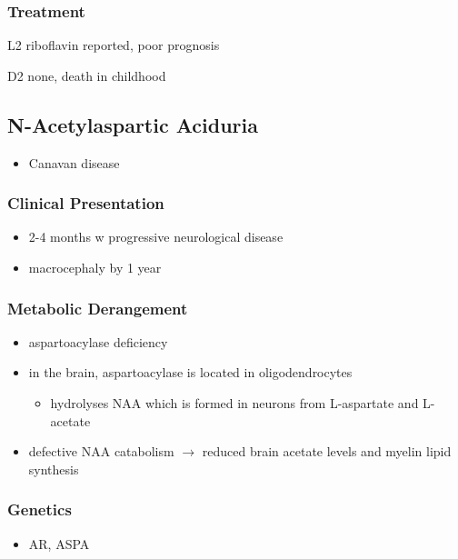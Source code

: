 \documentclass{scrartcl}
\begin{document}
\subsubsection{Treatment}
\label{sec:org995fa78}
\begin{description}
\item{L2} riboflavin reported, poor prognosis
\item{D2} none, death in childhood
\end{description}

\subsection{N-Acetylaspartic Aciduria}
\label{sec:org6b6e5f5}
\begin{itemize}
\item Canavan disease
\end{itemize}
\subsubsection{Clinical Presentation}
\label{sec:org4c83abd}
\begin{itemize}
\item 2-4 months w progressive neurological disease
\item macrocephaly by 1 year
\end{itemize}

\subsubsection{Metabolic Derangement}
\label{sec:org5035cd3}
\begin{itemize}
\item aspartoacylase deficiency
\end{itemize}
\begin{itemize}
\item in the brain, aspartoacylase is located in oligodendrocytes
\begin{itemize}
\item hydrolyses NAA which is formed in neurons from L-aspartate and
L-acetate
\end{itemize}
\item defective NAA catabolism \(\to\) reduced brain acetate levels and myelin
lipid synthesis
\end{itemize}

\subsubsection{Genetics}
\label{sec:org2f4c452}
\begin{itemize}
\item AR, ASPA
\end{itemize}
\end{document}
